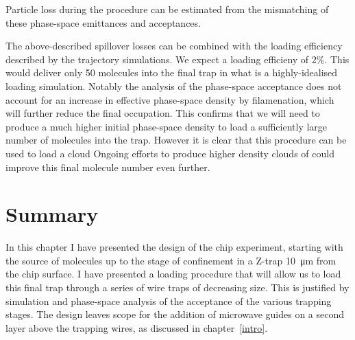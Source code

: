 Particle loss during the procedure can be estimated from the mismatching
of these phase-space emittances and acceptances.

The above-described spillover losses can be combined with the loading efficiency
described by the trajectory simulations. We 
expect a loading efficieny of 2\%. This would deliver only 50 molecules into
the final trap in what is a highly-idealised loading simulation. Notably the
analysis of the phase-space acceptance does not account for an increase in
effective phase-space density by filamenation, which will further reduce the
final occupation. This confirms
that we will need to produce a much higher initial phase-space density to
load a sufficiently large number of molecules into the trap. However it is
clear that this procedure can be used to load a cloud Ongoing efforts to produce higher
density clouds of \CaF{} could improve this final molecule number even further.

\section{Summary}

In this chapter I have presented the design of the chip experiment, starting
with the source of molecules up to the stage of confinement in a Z-trap
\SI{10}{\micro\meter} from the chip surface. I have presented
a loading procedure that will allow us to load this final trap through a series
of wire traps of decreasing size. This is justified by simulation and
phase-space analysis of the acceptance of the various trapping stages.
%
The design leaves scope for the addition of microwave guides on a second layer
above the trapping wires, as discussed in chapter~\ref{intro}.
